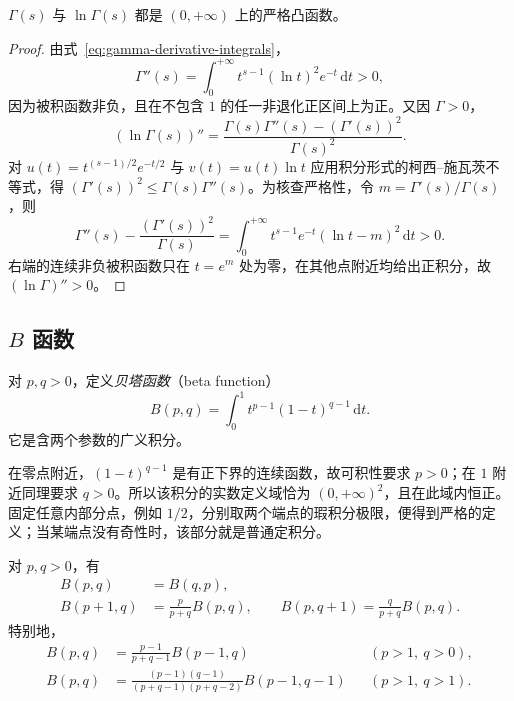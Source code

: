 \documentclass[UTF8,12pt,a4paper,fontset=fandol]{ctexbook}
\begin{document}
\begin{proposition}[严格凸性与严格对数凸性]
\label{prop:gamma-strict-log-convexity}
$\Gamma(s)$ 与 $\ln\Gamma(s)$ 都是 $(0,+\infty)$ 上的严格凸函数。
\end{proposition}

\begin{proof}
由式~\eqref{eq:gamma-derivative-integrals}，
\[
    \Gamma''(s)=\int_0^{+\infty}t^{s-1}(\ln t)^2e^{-t}\,\mathrm{d}t>0,
\]
因为被积函数非负，且在不包含 $1$ 的任一非退化正区间上为正。又因 $\Gamma>0$，
\[
    (\ln\Gamma(s))''
    =\frac{\Gamma(s)\Gamma''(s)-(\Gamma'(s))^2}{\Gamma(s)^2}.
\]
对 $u(t)=t^{(s-1)/2}e^{-t/2}$ 与 $v(t)=u(t)\ln t$ 应用积分形式的柯西--施瓦茨不等式，得 $(\Gamma'(s))^2\leq\Gamma(s)\Gamma''(s)$。为核查严格性，令 $m=\Gamma'(s)/\Gamma(s)$，则
\[
    \Gamma''(s)-\frac{(\Gamma'(s))^2}{\Gamma(s)}
    =\int_0^{+\infty}t^{s-1}e^{-t}(\ln t-m)^2\,\mathrm{d}t>0.
\]
右端的连续非负被积函数只在 $t=e^m$ 处为零，在其他点附近均给出正积分，故 $(\ln\Gamma)''>0$。
\end{proof}

\subsection{\texorpdfstring{$B$}{B} 函数}
\label{subsec:beta-function}

\begin{definition}[贝塔函数]
\label{def:beta-euler-integral}
对 $p,q>0$，定义\emph{贝塔函数}（beta function）
\begin{equation}
    B(p,q)=\int_0^1 t^{p-1}(1-t)^{q-1}\,\mathrm{d}t.
    \label{eq:beta-euler-integral}
\end{equation}
它是含两个参数的广义积分。
\end{definition}

在零点附近，$(1-t)^{q-1}$ 是有正下界的连续函数，故可积性要求 $p>0$；在 $1$ 附近同理要求 $q>0$。所以该积分的实数定义域恰为 $(0,+\infty)^2$，且在此域内恒正。固定任意内部分点，例如 $1/2$，分别取两个端点的瑕积分极限，便得到严格的定义；当某端点没有奇性时，该部分就是普通定积分。

\begin{proposition}[对称性与递推公式]
\label{prop:beta-symmetry-recurrence}
对 $p,q>0$，有
\begin{align}
    B(p,q)&=B(q,p),\label{eq:beta-symmetry}\\
    B(p+1,q)&=\frac{p}{p+q}B(p,q),\qquad
    B(p,q+1)=\frac{q}{p+q}B(p,q).
    \label{eq:beta-forward-recurrence}
\end{align}
特别地，
\begin{align}
    B(p,q)&=\frac{p-1}{p+q-1}B(p-1,q)
        &&(p>1,\ q>0),\label{eq:beta-backward-recurrence}\\
    B(p,q)&=\frac{(p-1)(q-1)}{(p+q-1)(p+q-2)}B(p-1,q-1)
        &&(p>1,\ q>1).\label{eq:beta-double-recurrence}
\end{align}
\end{proposition}
\end{document}
